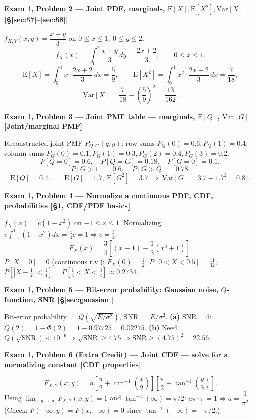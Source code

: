 \documentclass[11pt]{article}
\newcommand{\E}[1]{\mathrm{E}\left[#1\right]}
\newcommand{\Var}[1]{\mathrm{Var}\left[#1\right]}
\renewcommand{\P}[1]{P\left[#1\right]}
\newcommand{\topline}[1]{\par\vspace{5pt}\noindent{\color{#1}\rule{\linewidth}{1.1pt}}\par\vspace{3pt}}
\newcommand{\botline}[1]{\par\vspace{2pt}\noindent{\color{#1}\rule{\linewidth}{1.1pt}}\par\vspace{8pt}}
\newenvironment{examprob}[2]{%
  \topline{examcol}\noindent\textbf{\color{examcol}#1 --- #2}\par\smallskip\noindent\ignorespaces
}{\botline{examcol}}
\begin{document}
\begin{examprob}{Exam 1, Problem 2}{Joint PDF, marginals, $\E{X},\E{X^2},\Var{X}$ \hfill [\S\ref{sec:57}--\ref{sec:58}]}
$f_{X,Y}(x,y)=\dfrac{x+y}{3}$ on $0\le x\le1,\ 0\le y\le2$.
\[ f_X(x) = \int_0^2\frac{x+y}{3}\,dy = \frac{2x+2}{3}, \qquad 0\le x\le1. \]
\[ \E{X} = \int_0^1 x\cdot\frac{2x+2}{3}\,dx=\frac59, \qquad
\E{X^2} = \int_0^1 x^2\cdot\frac{2x+2}{3}\,dx=\frac{7}{18}, \]
\[ \Var{X} = \frac{7}{18}-\left(\frac59\right)^2=\boxed{\frac{13}{162}}. \]
\end{examprob}

\begin{examprob}{Exam 1, Problem 3}{Joint PMF table --- marginals, $\E{Q}$, $\Var{G}$ \hfill [Joint/marginal PMF]}
Reconstructed joint PMF $P_{Q,G}(q,g)$: row sums $P_Q(0)=0.6,P_Q(1)=0.4$; column sums
$P_G(0){=}0.1,P_G(1){=}0.3,P_G(2){=}0.4,P_G(3){=}0.2$.
\[ \P{Q=0}=0.6,\quad \P{Q=G}=0.18,\quad \P{G=0}=0.1, \]
\[ \P{G>1}=0.6,\quad \P{G>Q}=0.78. \]
\[ \E{Q}=0.4. \qquad \E{G}=1.7,\ \E{G^2}=3.7\ \Longrightarrow\ \boxed{\Var{G}=3.7-1.7^2=0.81}. \]
\end{examprob}

\begin{examprob}{Exam 1, Problem 4}{Normalize a continuous PDF, CDF, probabilities \hfill [\S1, CDF/PDF basics]}
$f_X(x)=c(1-x^2)$ on $-1\le x\le1$. Normalizing: $c\int_{-1}^1(1-x^2)dx=\frac43c=1\Rightarrow
\boxed{c=\frac34}$.
\[ F_X(x)=\frac34\left[(x+1)-\frac13(x^3+1)\right]. \]
$\P{X=0}=0$ (continuous r.v.); $F_X(0)=\frac12$; $\P{0<X<0.5}=\frac{11}{32}$;
$\P{|X-\tfrac12|<\tfrac14}=\P{\tfrac14<X<\tfrac34}\approx0.2734$.
\end{examprob}

\begin{examprob}{Exam 1, Problem 5}{Bit-error probability: Gaussian noise, $Q$-function, SNR \hfill [\S\ref{sec:gaussian}]}
Bit-error probability $=Q(\sqrt{E/\sigma^2})$, SNR $=E/\sigma^2$.
\textbf{(a)} SNR$=4$: $Q(2)=1-\Phi(2)=1-0.97725=\boxed{0.02275}$.
\textbf{(b)} Need $Q(\sqrt{\text{SNR}})<10^{-6}\Rightarrow\sqrt{\text{SNR}}\ge4.75\Rightarrow
\boxed{\text{SNR}\ge(4.75)^2=22.56}$.
\end{examprob}

\begin{examprob}{Exam 1, Problem 6 (Extra Credit)}{Joint CDF --- solve for a normalizing constant \hfill [CDF properties]}
\[ F_{X,Y}(x,y)=a\left[\frac\pi2+\tan^{-1}\!\left(\frac x2\right)\right]\left[\frac\pi2+\tan^{-1}\!\left(\frac y3\right)\right]. \]
Using $\lim_{x,y\to\infty}F_{X,Y}(x,y)=1$ and $\tan^{-1}(\infty)=\pi/2$: $a\pi\cdot\pi=1
\Rightarrow \boxed{a=\dfrac{1}{\pi^2}}$. (Check: $F(-\infty,y)=F(x,-\infty)=0$ since
$\tan^{-1}(-\infty)=-\pi/2$.)
\end{examprob}
\end{document}
